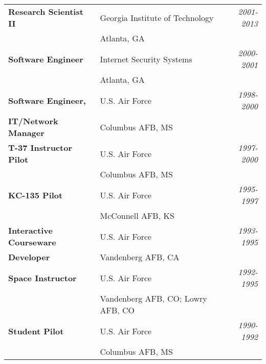 \documentclass[12pt]{gatech-thesis}
\begin{document}
\begin{postliminary}
\begin{vita}
\begin{tabular}{llr}
\textbf{Research Scientist II} & Georgia Institute of Technology
                               &{\sl 2001-2013}\\
                            & Atlanta, GA & \\
\textbf{Software Engineer} & Internet Security Systems & {\sl
  2000-2001}\\
                           & Atlanta, GA & \\
\textbf{Software Engineer,} & U.S. Air Force & {\sl 1998-2000}\\
\textbf{IT/Network Manager} & Columbus AFB, MS & \\
\textbf{T-37 Instructor Pilot} & U.S. Air Force & {\sl 1997-2000}\\
                           & Columbus AFB, MS & \\
\textbf{KC-135 Pilot} & U.S. Air Force & {\sl 1995-1997}\\
                           & McConnell AFB, KS & \\
\textbf{Interactive Courseware} & U.S. Air Force & {\sl 1993-1995}\\
\textbf{Developer} & Vandenberg AFB, CA & \\
\textbf{Space Instructor} & U.S. Air Force & {\sl 1992-1995}\\
                           & Vandenberg AFB, CO; Lowry AFB, CO & \\
\textbf{Student Pilot} & U.S. Air Force & {\sl 1990-1992}\\
                           & Columbus AFB, MS &
\end{tabular}

\end{vita}
\end{postliminary}
\end{document}
